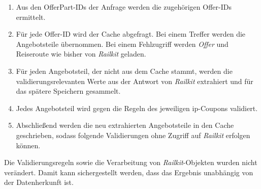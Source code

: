 \begin{enumerate}
    \item Aus den OfferPart-IDs der Anfrage werden die zugehörigen Offer-IDs ermittelt.
    \item Für jede Offer-ID wird der Cache abgefragt. Bei einem Treffer werden die Angebotsteile übernommen. Bei einem Fehlzugriff werden \textit{Offer} und Reiseroute wie bisher von \textit{Railkit} geladen.
    \item Für jeden Angebotsteil, der nicht aus dem Cache stammt, werden die validierungsrelevanten Werte aus der Antwort von \textit{Railkit} extrahiert und für das spätere Speichern gesammelt.
    \item Jedes Angebotsteil wird gegen die Regeln des jeweiligen \ac{ip}-Coupons validiert.
    \item Abschließend werden die neu extrahierten Angebotsteile in den Cache geschrieben, sodass folgende Validierungen ohne Zugriff auf \textit{Railkit} erfolgen können.
\end{enumerate}

Die Validierungsregeln sowie die Verarbeitung von \textit{Railkit}-Objekten wurden nicht verändert. Damit kann sichergestellt werden, dass das Ergebnis unabhängig von der Datenherkunft ist.




